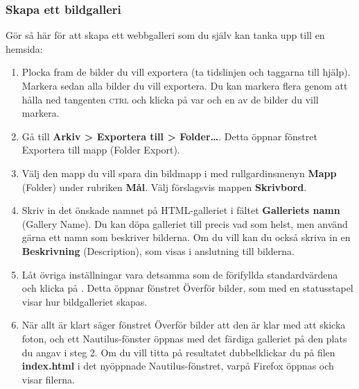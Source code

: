 \documentclass[a4paper,final]{memoir} %
\begin{document}

\subsubsection{Skapa ett bildgalleri}

Gör så här för att skapa ett webbgalleri som du själv kan tanka upp till en hemsida:

\begin{enumerate}

\item Plocka fram de bilder du vill exportera (ta tidslinjen och taggarna till hjälp). Markera sedan alla bilder du vill exportera. Du kan markera flera genom att hålla ned tangenten \textsc{ctrl} och klicka på var och en av de bilder du vill markera.

\item Gå till \textbf{Arkiv \textgreater{} Exportera till \textgreater{} Folder\ldots{}}. Detta öppnar fönstret Exportera till mapp (Folder Export).

\item Välj den mapp du vill spara din bildmapp i med rullgardinsmenyn \textbf{Mapp} (Folder) under rubriken \textbf{Mål}. Välj förslagsvis mappen \textbf{Skrivbord}.

\item Skriv in det önskade namnet på HTML-galleriet i fältet \textbf{Galleriets namn} (Gallery Name). Du kan döpa galleriet till precis vad som helst, men använd gärna ett namn som beskriver bilderna. Om du vill kan du också skriva in en \textbf{Beskrivning} (Description), som visas i anslutning till bilderna.

\item Låt övriga inställningar vara detsamma som de förifyllda standardvärdena och klicka på \xok{}. Detta öppnar fönstret Överför bilder, som med en statusstapel visar hur bildgalleriet skapas.

\item När allt är klart säger fönstret Överför bilder att den är klar med att skicka foton, och ett Nautilus-fönster öppnas med det färdiga galleriet på den plats du angav i steg 2. Om du vill titta på resultatet dubbelklickar du på filen \textbf{index.html} i det nyöppnade Nautilus-fönstret, varpå Firefox öppnas och visar filerna.

\end{enumerate}
\end{document}
